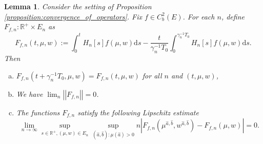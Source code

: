 \documentclass[a4paper]{article}
\newcommand{\bR}{\mathbb{R}}
\newcommand{\dd}{ \mathrm{d}}
\newcommand{\vn}[1]{\left| \! \left| #1\right| \! \right|}
\numberwithin{equation}{section}
\newtheorem{lemma}[theorem]{Lemma}
\theoremstyle{definition}
\begin{document}
\begin{lemma} \label{lemma:integral_perturbation}
	Consider the setting of Proposition \ref{proposition:convergence_of_operators}. Fix $f \in C_b^2(E)$. For each $n$, define $F_{f,n} : \bR^+ \times E_n$ as
	\begin{equation*}
		F_{f,n}(t,\mu,w) := \int_0^{t} H_n[s] f(\mu,w) \dd s - \frac{t}{\gamma_n^{-1}T_0} \int_0^{\gamma_n^{-1} T_0} H_n[s] f(\mu,w) \dd s.
	\end{equation*}
	Then
	\begin{enumerate}[(a)]
		\item $F_{f,n}(t + \gamma_n^{-1}T_0, \mu,w) = F_{f,n}(t , \mu,w)$ for all $n$ and $(t,\mu,w)$,
		\item We have $\lim_n \vn{F_{f,n}} = 0$.
		\item The functions $F_{f,n}$ satisfy the following Lipschitz estimate
		\begin{equation} \label{eqn:assumption_Ffn}
			\lim_{n \rightarrow \infty} \sup_{s \in \bR^+, (\mu,w) \in E_n} \sup_{(\hat{a},\hat{b}): \mu(\hat{a}) > 0}  n \left| F_{f,n}(\mu^{\hat{a},\hat{b}},w^{\hat{a},\hat{b}}) - F_{f,n}(\mu,w)  \right| = 0.
		\end{equation}
	\end{enumerate}
\end{lemma}
\end{document}
